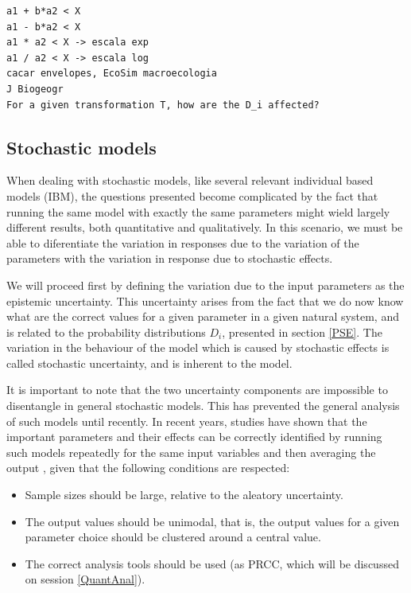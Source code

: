 \begin{verbatim}
a1 + b*a2 < X
a1 - b*a2 < X
a1 * a2 < X -> escala exp
a1 / a2 < X -> escala log
cacar envelopes, EcoSim macroecologia
J Biogeogr
For a given transformation T, how are the D_i affected?
\end{verbatim}

\subsection{Stochastic models}
When dealing with stochastic models, like several relevant individual based 
models (IBM), the questions presented become complicated by the fact that 
running the same model with exactly the same parameters might wield largely 
different results, both quantitative and qualitatively. In this scenario,
we must be able to diferentiate the variation in responses due to the variation
of the parameters with the variation in response due to stochastic effects.

We will proceed first by defining the variation due to the input parameters as
the epistemic uncertainty. This uncertainty arises from the fact that we do
now know what are the correct values for a given parameter in a given natural
system, and is related to the probability distributions $D_i$, presented 
in section \ref{PSE}. The variation in the behaviour of the model which is
caused by stochastic effects is called stochastic uncertainty, and is inherent
to the model. 

It is important to note that the two uncertainty components are impossible
to disentangle in general stochastic models. This has prevented the general
analysis of such models until recently. In recent years, studies have shown
that the important parameters and their effects can be correctly identified
by running such models repeatedly for the same input variables and then
averaging the output \cite{Segovia04}, given that
the following conditions are respected:

\begin{itemize}
	\item Sample sizes should be large, relative to the aleatory
		uncertainty.
	\item The output values should be unimodal, that is, the output values
		for a given parameter choice should be clustered around a 
		central value.
	\item The correct analysis tools should be used (as PRCC, which will be
		discussed on session \ref{QuantAnal}).
\end{itemize}

